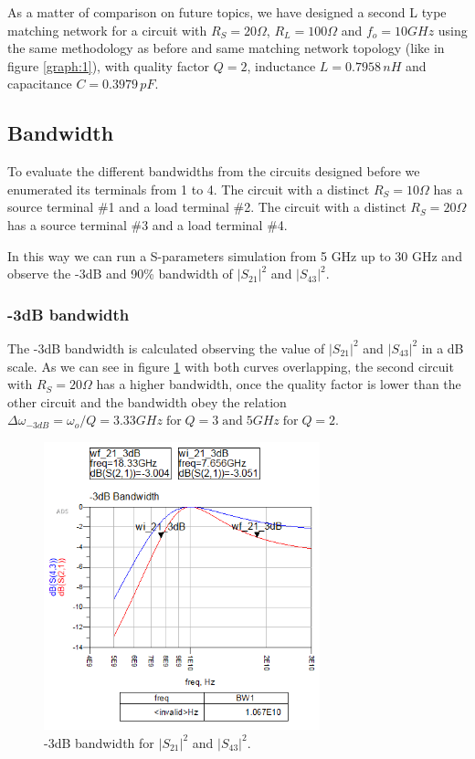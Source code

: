 As a matter of comparison on future topics, we have designed a second L type matching network for a circuit with $R_S=20 \Omega$, $R_L=100 \Omega$ and $f_o = 10 GHz$ using the same methodology as before and same matching network topology (like in figure \ref{graph:1}), with quality factor $Q = 2$, inductance $L = 0.7958 \, nH$ and capacitance $C = 0.3979 \, pF$.

\subsection{Bandwidth}

To evaluate the different bandwidths from the circuits designed before we enumerated its terminals from 1 to 4. The circuit with a distinct $R_S=10 \Omega$ has a source terminal \#1 and a load terminal \#2. The circuit with a distinct $R_S=20 \Omega$ has a source terminal \#3 and a load terminal \#4.

In this way we can run a S-parameters simulation from 5 GHz up to 30 GHz and observe the -3dB and 90\% bandwidth of $|S_{21}|^2$ and $|S_{43}|^2$.

\subsubsection{-3dB bandwidth}

The -3dB bandwidth is calculated observing the value of $|S_{21}|^2$ and $|S_{43}|^2$ in a dB scale. As we can see in figure \ref{fig:bw1} with both curves overlapping, the second circuit with $R_S = 20 \Omega$ has a higher bandwidth, once the quality factor is lower than the other circuit and the bandwidth obey the relation $\Delta\omega_{-3dB} = \omega_o / Q = 3.33 GHz \; \text{for} \; Q=3 \; \text{and} \; 5 GHz \; \text{for} \; Q=2 $.

\begin{figure}[H] 
\centering
\includegraphics[width=8cm]{images/BW1.PNG}
\caption{-3dB bandwidth for $|S_{21}|^2$ and $|S_{43}|^2$.}
\label{fig:bw1} 
\end{figure}

